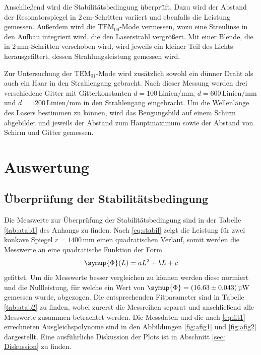 Anschließend wird die Stabilitätsbedingung überprüft. Dazu wird der Abstand der Resonatorspiegel in $2 \, \si{\centi\meter}$-Schritten
variiert und ebenfalls die Leistung gemessen. 
Außerdem wird die $\text{TEM}_{00}$-Mode vermessen, wozu eine Streulinse in den Aufbau integriert wird, die den Laserstrahl vergrößert.
Mit einer Blende, die in $2 \, \si{\milli\meter}$-Schritten verschoben wird, wird jeweils ein kleiner Teil des Lichts 
herausgefiltert, dessen Strahlungsleistung gemessen wird. 

Zur Untersuchung der $\text{TEM}_{01}$-Mode wird zusätzlich sowohl ein dünner Draht als auch ein Haar in den Strahlengang gebracht.
Nach dieser Messung werden drei verschiedene Gitter mit Gitterkonstanten $d = 100 \, \text{Linien} / \si{\milli\meter}$, $d = 600 \, \text{Linien} / \si{\milli\meter}$ und $d = 1200 \, \text{Linien} / \si{\milli\meter}$
in den Strahlengang eingebracht. Um die Wellenlänge des Lasers bestimmen zu können, wird das Beugungsbild 
auf einem Schirm abgebildet und jeweils der Abstand zum Hauptmaximum sowie der Abstand von Schirm und Gitter gemessen.


\section{Auswertung}
\subsection{Überprüfung der Stabilitätsbedingung}
Die Messwerte zur Überprüfung der Stabilitätsbedingung sind in der Tabelle \ref{tab:atab1} des Anhangs zu finden.
Nach \eqref{eq:stabil} zeigt die Leistung für zwei konkave Spiegel $r=1400\,\si{\mm}$ einen quadratischen Verlauf, somit werden die Messwerte an eine quadratische Funktion der Form
\begin{equation}
    \symup{\Phi}(L) = a L^2 + b L + c \label{eq:fit1}
\end{equation}
gefittet. 
Um die Messwerte besser vergleichen zu können werden diese normiert und die Nullleistung, für welche ein Wert von $\symup{\Phi} = (16.63 \pm 0.043) \, \si{\micro\W}$ gemessen wurde, abgezogen.
Die entsprechenden Fitparameter sind in Tabelle \ref{tab:atab2} zu finden, wobei zurerst die Messreihen separat und anschließend alle Messwerte zusammen betrachtet werden. 
Die Messdaten und die nach \eqref{eq:fit1} errechneten Ausgleichspolynome sind in den Abbildungen \ref{fig:afig1} und \ref{fig:afig2} dargestellt.
Eine ausführliche Diskussion der Plots ist in Abschnitt \ref{sec: Diskussion} zu finden.

